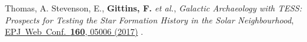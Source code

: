 \secstartswithlist{}%
\addtocounter{pubCounter}{-1}%
\begin{etaremune}[start=\value{pubCounter}]
    \item Thomas, A. Stevenson, E., \textbf{Gittins, F.} \textit{et al.},
    \textit{Galactic Archaeology with TESS: Prospects for Testing the Star
    Formation History in the Solar Neighbourhood},
    \href{https://doi.org/10.1051/epjconf/201716005006}%
    {EPJ\ Web\ Conf.\ \textbf{160}, 05006 (2017)}
    .
\end{etaremune}


